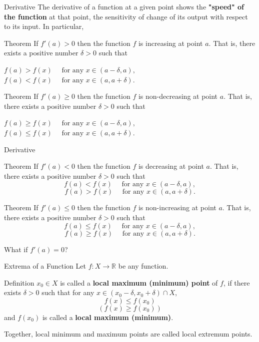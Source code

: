\documentclass{beamer}
\begin{document}


\begin{frame}{Derivative}
The derivative of a function at a given point shows the \textbf{"speed" of the function} at that point, the sensitivity of change of its output with respect to its input. \pause In particular,
\begin{block}{Theorem}
    If $f'(a) > 0$ then the function $f$ is increasing at point $a$. That is, there exists a positive number $\delta >0$ such that 
    \begin{center}
        $f(a)>f(x)\quad\text{ for any }x\in(a-\delta,a),$ \\ $f(a)<f(x)\quad\text{ for any }x\in(a,a+\delta). $
    \end{center}
\end{block}\pause
\begin{block}{Theorem}
    If $f'(a) \ge 0$ then the function $f$ is non-decreasing at point $a$. That is, there exists a positive number $\delta >0$ such that  
    \begin{center}
        $f(a) \ge f(x)\quad\text{ for any }x\in(a-\delta,a),$ \\ $f(a)\le f(x)\quad\text{ for any }x\in(a,a+\delta). $
    \end{center}
\end{block}
\end{frame}


\begin{frame}{Derivative}
\begin{block}{Theorem}
    If $f'(a) < 0$ then the function $f$ is decreasing at point $a$. That is, there exists a positive number $\delta >0$ such that $$ f(a)<f(x)\quad\text{ for any }x\in(a-\delta,a),$$$$f(a)>f(x)\quad\text{ for any }x\in(a,a+\delta). $$
\end{block}
\begin{block}{Theorem}
    If $f'(a) \le 0$ then the function $f$ is non-increasing at point $a$. That is, there exists a positive number $\delta >0$ such that \[ f(a)\le f(x)\quad\text{ for any }x\in(a-\delta,a),\]\[ f(a) \ge f(x)\quad\text{ for any }x\in(a,a+\delta). \]
\end{block}\pause
What if $f'(a)=0$?
\end{frame}


\begin{frame}{Extrema of a Function}
Let \(f : X \to \mathbb{R}\) be any function.
\begin{block}{Definition}
     \(x_0\in X\) is called a \textbf{local maximum (minimum) point} of \(f\), if there exists \(\delta > 0\) such that for any \(x \in (x_0 - \delta, x_0 + \delta)\cap X\), 
     \[f(x) \leq f(x_0)\]
     \[(f(x) \geq f(x_0))\]
\pause and $f(x_0)$ is called a \textbf{local maximum (minimum)}.
\end{block}

\pause Together, local minimum and maximum points are called local extremum points.
\end{frame}
\end{document}

